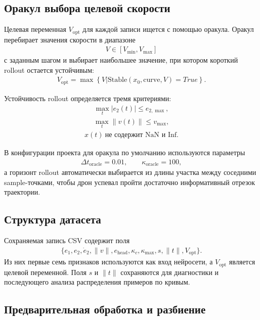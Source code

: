 \subsection{Оракул выбора целевой скорости}

Целевая переменная $V_{\mathrm{opt}}$ для каждой записи ищется с помощью оракула. Оракул перебирает значения скорости в диапазоне
\begin{gather}
    V \in [V_{\min}, V_{\max}]
\end{gather}
с заданным шагом и выбирает наибольшее значение, при котором короткий rollout остается устойчивым:
\begin{gather}
    V_{\mathrm{opt}} = \max \left\{ V | \mathrm{Stable}(x_0,\mathrm{curve},V) = True \right\}.
\end{gather}

Устойчивость rollout определяется тремя критериями:
\begin{gather}
    \max_t |e_2(t)| \le e_{2,\max},
\end{gather}
\begin{gather}
    \max_t \|v(t)\| \le v_{\max},
\end{gather}
\begin{gather}
    x(t) \ \text{не содержит NaN и Inf}.
\end{gather}

В конфигурации проекта для оракула по умолчанию используются параметры
\begin{gather}
    \Delta t_{\mathrm{oracle}} = 0.01, \qquad \kappa_{\mathrm{oracle}} = 100,
\end{gather}
а горизонт rollout автоматически выбирается из длины участка между соседними sample-точками, чтобы дрон успевал пройти достаточно информативный отрезок траектории.

\subsection{Структура датасета}

Сохраняемая запись CSV содержит поля
\begin{gather}
    \{e_1, e_2, \dot{e}_2, \|v\|, e_{\mathrm{head}}, \kappa_c, \kappa_{\max}, s, \|t\|, V_{\mathrm{opt}}\}.
\end{gather}
Из них первые семь признаков используются как вход нейросети, а $V_{\mathrm{opt}}$ является целевой переменной.
Поля $s$ и $\|t\|$ сохраняются для диагностики и последующего анализа распределения примеров по кривым.

\subsection{Предварительная обработка и разбиение}

